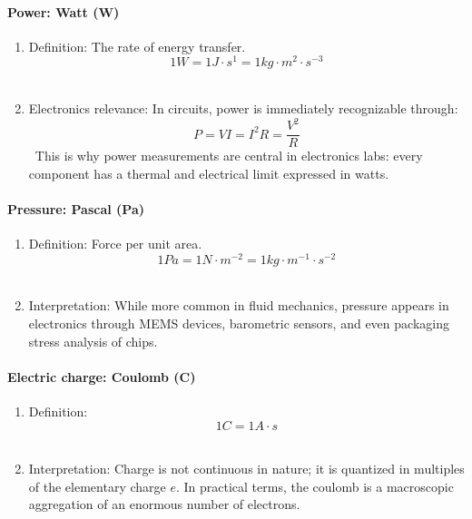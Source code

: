 \documentclass[../main.tex]{subfiles}
\begin{document}
\paragraph{Power: Watt (W)}

\begin{enumerate}[label=\textbf{-}]
	\item Definition: The rate of energy transfer.
	\[ 1 \unit{W} = 1 \unit{J} \cdot \unit{s}^1 = 1 \unit{kg} \cdot \unit{m}^2 \cdot \unit{s}^{-3} \]\
	\item Electronics relevance: In circuits, power is immediately recognizable through:
	\[ P = VI = I^2R = \frac{V^2}{R}\]\
	This is why power measurements are central in electronics labs: every component has a thermal and electrical limit expressed in watts.\\
\end{enumerate}

\paragraph{Pressure: Pascal (Pa)}

\begin{enumerate}[label=\textbf{-}]
	\item Definition: Force per unit area.
	\[ 1 \unit{Pa} = 1 \unit{N} \cdot \unit{m}^{-2} = 1 \unit{kg} \cdot \unit{m}^{-1} \cdot \unit{s}^{-2} \]\
	\item Interpretation: While more common in fluid mechanics, pressure appears in electronics through MEMS devices, barometric sensors, and even packaging stress analysis of chips.\\
\end{enumerate}

\paragraph{Electric charge: Coulomb (C)}

\begin{enumerate}[label=\textbf{-}]
	\item Definition:
	\[ 1\unit{C} = 1 \unit{A} \cdot \unit{s} \]\
	\item Interpretation: Charge is not continuous in nature; it is quantized in multiples of the elementary charge $e$. In practical terms, the coulomb is a macroscopic aggregation of an enormous number of electrons.\\
\end{enumerate}
\end{document}
